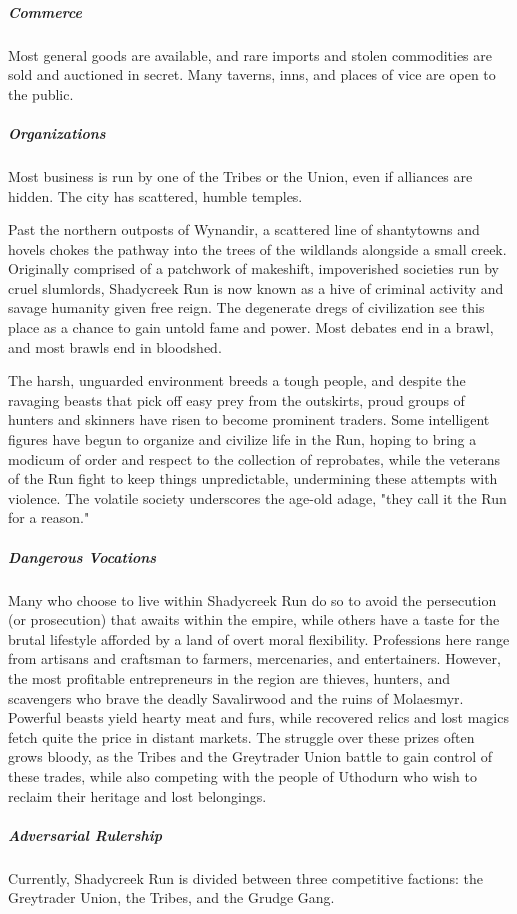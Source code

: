 \documentclass[10pt,a4paper,twoside,bg=print,twocolumn,openany,nodeprecatedcode]{dndbook}
\begin{document}
\subparagraph{Commerce}
Most general goods are available, and rare imports and stolen commodities are sold and auctioned in secret. Many taverns, inns, and places of vice are open to the public.

\subparagraph{Organizations}
Most business is run by one of the Tribes or the Union, even if alliances are hidden. The city has scattered, humble temples.

Past the northern outposts of Wynandir, a scattered line of shantytowns and hovels chokes the pathway into the trees of the wildlands alongside a small creek. Originally comprised of a patchwork of makeshift, impoverished societies run by cruel slumlords, Shadycreek Run is now known as a hive of criminal activity and savage humanity given free reign. The degenerate dregs of civilization see this place as a chance to gain untold fame and power. Most debates end in a brawl, and most brawls end in bloodshed.

The harsh, unguarded environment breeds a tough people, and despite the ravaging beasts that pick off easy prey from the outskirts, proud groups of hunters and skinners have risen to become prominent traders. Some intelligent figures have begun to organize and civilize life in the Run, hoping to bring a modicum of order and respect to the collection of reprobates, while the veterans of the Run fight to keep things unpredictable, undermining these attempts with violence. The volatile society underscores the age-old adage, "they call it the Run for a reason."

\subparagraph{Dangerous Vocations}
Many who choose to live within Shadycreek Run do so to avoid the persecution (or prosecution) that awaits within the empire, while others have a taste for the brutal lifestyle afforded by a land of overt moral flexibility. Professions here range from artisans and craftsman to farmers, mercenaries, and entertainers. However, the most profitable entrepreneurs in the region are thieves, hunters, and scavengers who brave the deadly Savalirwood and the ruins of Molaesmyr. Powerful beasts yield hearty meat and furs, while recovered relics and lost magics fetch quite the price in distant markets. The struggle over these prizes often grows bloody, as the Tribes and the Greytrader Union battle to gain control of these trades, while also competing with the people of Uthodurn who wish to reclaim their heritage and lost belongings.

\subparagraph{Adversarial Rulership}
Currently, Shadycreek Run is divided between three competitive factions: the Greytrader Union, the Tribes, and the Grudge Gang.
\end{document}
